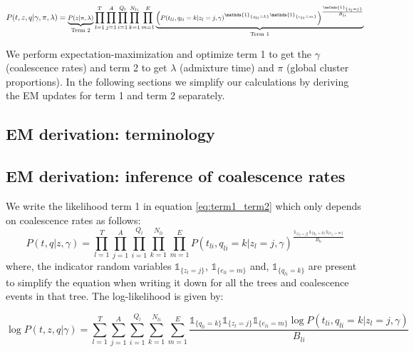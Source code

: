 \begin{equation}
    \footnotesize
    P (t,z,q \vert \gamma, \pi, \lambda) = \underbrace{P(z \vert \pi, \lambda)}_{\text{Term 2}} \prod_{l =1}^{T} \prod_{j = 1}^A \prod_{i = 1}^{Q_l} \prod_{k =1}^{N_{li}} \prod_{m = 1}^E \underbrace{\Big( P(t_{li}, q_{li} = k \vert z_l = j, \gamma) ^ {\mathds{1}_{\{q_{l i} = k\}}  \mathds{1}_{\{e_{l i} = m\}}} \Big) ^{\frac{\mathds{1}_{\{z_l = j\}}}{B_{li}}}}_{\text{Term 1}}
    \label{eq:term1_term2}
\end{equation}

We perform expectation-maximization and optimize term 1 to get the $\gamma$ (coalescence rates) and term 2 to get $\lambda$ (admixture time) and $\pi$ (global cluster proportions). In the following sections we simplify our calculations by deriving the EM updates for term 1 and term 2 separately. 

\subsection{EM derivation: terminology}


\subsection{EM derivation: inference of coalescence rates}
We write the likelihood term 1 in equation \ref{eq:term1_term2} which only depends on coalescence rates as follows: 
\begin{equation}
     P(t, q \vert z, \gamma) = \prod_{l = 1}^T \prod_{j = 1}^A \prod_{i = 1}^{Q_l} \prod_{k =1}^{N_{li}} \prod_{m = 1}^E   P(t_{li}, q_{l i} = k \vert z_l = j, \gamma) ^ {\frac{\mathds{1}_{\{z_l = j\}}\mathds{1}_{\{q_{l i} = k\}}  \mathds{1}_{\{e_{l i} = m\}}}{B_{li}}}
\label{eq:scaled_ll}
\end{equation}
where, the indicator random variables $\mathds{1}_{\{z_l = j\}}$, $\mathds{1}_{\{e_{l i} = m\}}$ and, $\mathds{1}_{\{q_{l i} = k\}}$ are present to simplify the equation when writing it down for all the trees and coalescence events in that tree. The log-likelihood is given by:

\begin{equation}
     \log P(t, z, q \vert \gamma) = \sum_{l = 1}^T \sum_{j = 1}^A \sum_{i = 1}^{Q_l} \sum_{k =1}^{N_{li}} \sum_{m = 1}^E  \frac{\mathds{1}_{\{q_{l i} = k\}} \mathds{1}_{\{z_l = j\}} \mathds{1}_{\{e_{l i} = m\}} \log P(t_{li}, q_{l i} = k \vert z_l = j, \gamma)}{B_{li}} 
\end{equation}

